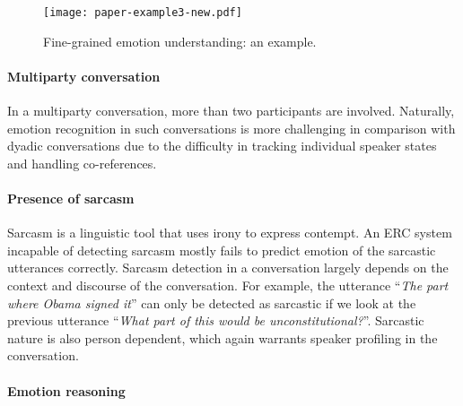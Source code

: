 \documentclass{IEEEtran}\usepackage[pdftex]{graphicx}
\begin{document}
	\begin{figure}[h] 
		\centering 
		\small
		\texttt{[image: paper-example3-new.pdf]} 
		\caption{Fine-grained emotion understanding: an example.}
		\label{fig:exampleshift}
	\end{figure}
	
	\paragraph{Multiparty conversation}
	In a multiparty conversation, more than two participants are involved. Naturally, emotion recognition in such conversations is more challenging in comparison with dyadic conversations due to the difficulty in tracking individual speaker states and handling co-references.
	
	\paragraph{Presence of sarcasm}


Sarcasm is a linguistic tool that uses irony to express contempt. An ERC system incapable of detecting sarcasm mostly fails to predict emotion of the sarcastic utterances correctly. Sarcasm detection in a conversation largely depends on the context and discourse of the conversation. For example, the utterance ``\textit{The part where Obama signed it}'' can only be detected as sarcastic if we look at the previous utterance ``\textit{What part of this would be unconstitutional?}''. Sarcastic nature is also person dependent, which again warrants speaker profiling in the conversation.
	


	\paragraph{Emotion reasoning}
	
\end{document}
